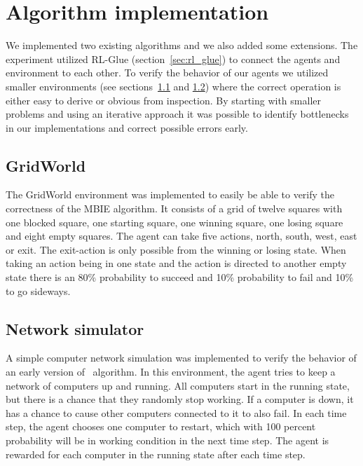 \section{Algorithm implementation}
\label{sec:implementation}

We implemented two existing algorithms and we also added some extensions.  The
experiment utilized RL-Glue (section~\ref{sec:rl_glue}) to connect the agents
and environment to each other.  To verify the behavior of our agents we utilized smaller
environments (see sections~\ref{sec:intro_grid_world} and \ref{sec:ns}) where
the correct operation is either easy to derive or obvious from inspection. By
starting with smaller problems and using an iterative approach it was possible
to identify bottlenecks in our implementations and correct possible errors
early.





\subsection{GridWorld}
\label{sec:intro_grid_world}

The GridWorld environment was implemented to easily be able to verify the
correctness of the MBIE algorithm. It consists of a grid of twelve squares with
one blocked square, one starting square, one winning square, one losing square and
eight empty squares. The agent can take five actions, north, south, west,
east or exit. The exit-action is only possible from the winning or losing
state. When taking an action being in one state and the action is directed to
another empty state there is an 80\% probability to succeed and 10\%
probability to fail and 10\% to go sideways.

\subsection{Network simulator}
\label{sec:ns}

A simple computer network simulation was implemented to verify the behavior of an
early version of \etre\ algorithm. In this environment, the agent tries to keep
a network of computers up and running. All computers start in the running
state, but there is a chance that they randomly stop working. If a computer is
down, it has a chance to cause other computers connected to it to also fail. In
each time step, the agent chooses one computer to restart, which with 100
percent probability will be in working condition in the next time step. The
agent is rewarded for each computer in the running state after each time step. 
